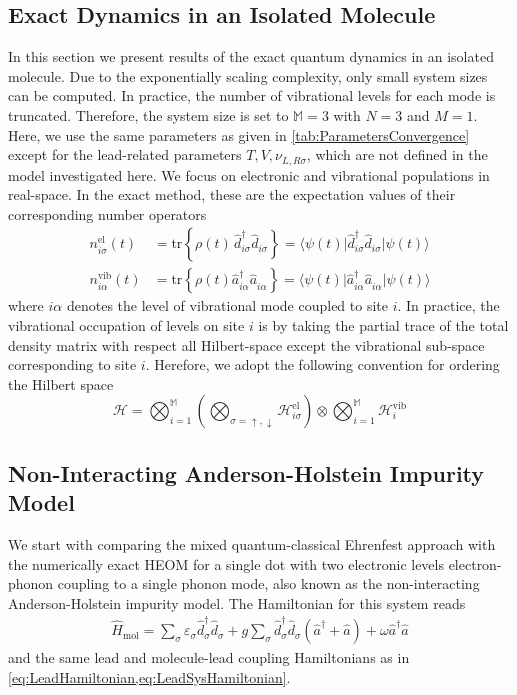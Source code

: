 \documentclass{article}
\newcommand{\pdagger}{{\phantom{\dagger}}}
\newcommand{\tr}[1]{\mathrm{tr}\left\{#1\right\}}
\newcommand{\expc}[3]{\langle #1\vert #2 \vert #3\rangle}
\begin{document}
\subsection{Exact Dynamics in an Isolated Molecule}
In this section we present results of the exact quantum dynamics in an isolated molecule. Due to the exponentially scaling complexity, only small system sizes can be computed. In practice, the number of vibrational levels for each mode is truncated. 
Therefore, the system size is set to $\mathbb{M}=3$ with $N=3$ and $M=1$.
Here, we use the same parameters as given in \cref{tab:ParametersConvergence} except for the lead-related parameters $T,V,\nu_{L,R\sigma}$, which are not defined in the model investigated here. 
We focus on electronic and vibrational populations in real-space. 
In the exact method, these are the expectation values of their corresponding number operators
\begin{align}
	n^\mathrm{el}_{i\sigma}(t) &= \tr{\rho(t) \, \hat{d}^\dagger_{i\sigma}\hat{d}^\pdagger_{i\sigma}} = \expc{\psi(t)}{\hat{d}^\dagger_{i\sigma}\hat{d}^\pdagger_{i\sigma}}{\psi(t)}\\
	n^\mathrm{vib}_{i\alpha}(t) &= \tr{\rho(t)\hat{a}_{i\alpha}^\dagger\hat{a}_{i\alpha}^\pdagger}= \expc{\psi(t)}{\hat{a}^\dagger_{i\alpha}\hat{a}^\pdagger_{i\alpha}}{\psi(t)} 
\end{align}
where $i\alpha$ denotes the level of vibrational mode coupled to site $i$. In practice, the vibrational occupation of levels on site $i$ is by taking the partial trace of the total density matrix with respect all Hilbert-space except the vibrational sub-space corresponding to site $i$. Herefore, we adopt the following convention for ordering the Hilbert space
\begin{equation}
	\mathcal{H} = \bigotimes_{i=1}^{\mathds{M}} \left(\bigotimes_{\sigma = \uparrow,\downarrow} \mathcal{H}^\mathrm{el}_{i\sigma}\right) \otimes \bigotimes_{i=1}^\mathds{M}\mathcal{H}^\mathrm{vib}_i
\end{equation}

\subsection{Non-Interacting Anderson-Holstein Impurity Model}
We start with comparing the mixed quantum-classical Ehrenfest approach with the numerically exact HEOM for a single dot with two electronic levels electron-phonon coupling to a single phonon mode, also known as the non-interacting Anderson-Holstein impurity model. The Hamiltonian for this system reads
\begin{align}
	\hat{H}_\mathrm{mol} = \sum_\sigma \varepsilon_\sigma^\pdagger \hat{d}_\sigma^\dagger \hat{d}_\sigma^\pdagger + g \sum_\sigma \hat{d}^\dagger_\sigma \hat{d}^\pdagger_\sigma (\hat{a}^\dagger + \hat{a}) + \omega \hat{a}^\dagger \hat{a} 
\end{align}
and the same lead and molecule-lead coupling Hamiltonians as in \cref{eq:LeadHamiltonian,eq:LeadSysHamiltonian}. 

\printbibliography
\end{document}
